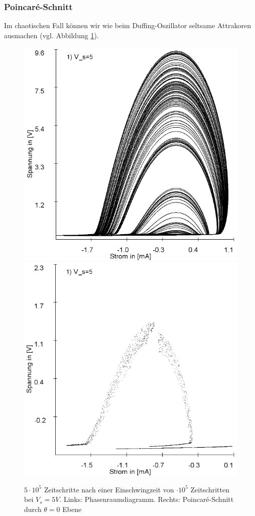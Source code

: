 \documentclass{scrartcl}
\begin{document}
\subsubsection{Poincaré-Schnitt}
 Im chaotischen Fall können wir wie beim Duffing-Oszillator seltsame Attrakoren ausmachen (vgl. Abbildung \ref{fig:ldr-poin1}).
\begin{figure}[!htbp]
\includegraphics[scale=0.4]{schwing-v5-euler}
\includegraphics[scale=0.4]{schwing-v5-euler-poincare}
\caption{$5\cdot10^5$ Zeitschritte nach einer Einschwingzeit von $\cdot10^5$ Zeitschritten bei $V_s=5V$. Links: Phasenraumdiagramm. Rechts: Poincaré-Schnitt durch $\theta=0$ Ebene}
\label{fig:ldr-poin1}
\end{figure}
\end{document}
